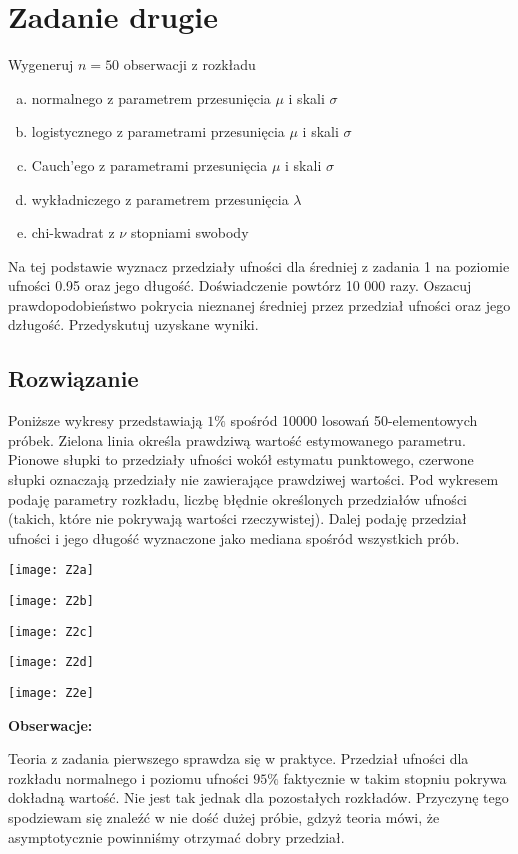 \documentclass[a4paper]{article}
\begin{document}
\section{Zadanie drugie}
Wygeneruj $n=50$ obserwacji z rozkładu
\begin{enumerate}[a.]
	\item normalnego z parametrem przesunięcia $\mu$ i skali $\sigma$
	\item logistycznego z parametrami przesunięcia $\mu$ i skali $\sigma$
	\item Cauch'ego z parametrami przesunięcia $\mu$ i skali $\sigma$
	\item wykładniczego z parametrem przesunięcia $\lambda$
	\item chi-kwadrat z $\nu$ stopniami swobody
\end{enumerate}
Na tej podstawie wyznacz przedziały ufności dla średniej z zadania 1 na poziomie ufności 0.95 oraz jego długość. Doświadczenie powtórz 10 000 razy. Oszacuj prawdopodobieństwo pokrycia nieznanej średniej przez przedział ufności oraz jego dzługość. Przedyskutuj uzyskane wyniki.


\subsection{Rozwiązanie}
Poniższe wykresy przedstawiają $1\%$ spośród 10000 losowań 50-elementowych próbek. Zielona linia określa prawdziwą wartość estymowanego parametru. Pionowe słupki to przedziały ufności wokół estymatu punktowego, czerwone słupki oznaczają przedziały nie zawierające prawdziwej wartości. Pod wykresem podaję parametry rozkładu, liczbę błędnie określonych przedziałów ufności (takich, które nie pokrywają wartości rzeczywistej). Dalej podaję przedział ufności i jego długość wyznaczone jako mediana spośród wszystkich prób.

\texttt{[image: Z2a]}

\texttt{[image: Z2b]}

\texttt{[image: Z2c]}

\texttt{[image: Z2d]}

\texttt{[image: Z2e]}

\textbf{Obserwacje:}

Teoria z zadania pierwszego sprawdza się w praktyce. Przedział ufności dla rozkładu normalnego i poziomu ufności $95\%$ faktycznie w takim stopniu pokrywa dokładną wartość. Nie jest tak jednak dla pozostałych rozkładów. Przyczynę tego spodziewam się znaleźć w nie dość dużej próbie, gdzyż teoria mówi, że asymptotycznie powinniśmy otrzymać dobry przedział.
\end{document}
